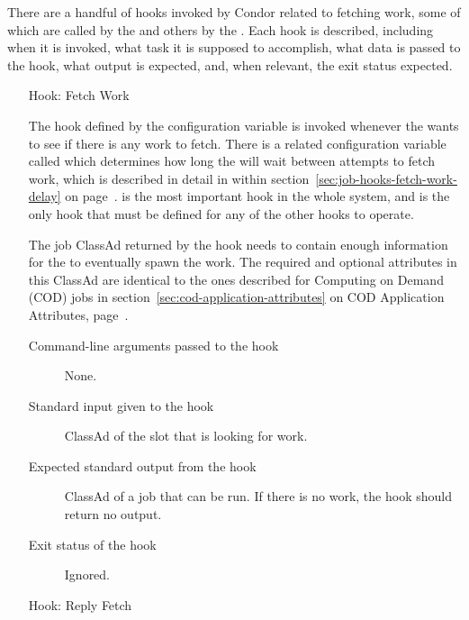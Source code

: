 There are a handful of hooks invoked by Condor related to fetching
work, some of which are called by the  and others by
the .
Each hook is described, including when it is invoked, what
task it is supposed to accomplish, what data is passed to the hook,
what output is expected, and, when relevant, the exit status expected.


\begin{itemize}
\item[Hook: Fetch Work]

The hook defined by the configuration variable
 is invoked whenever the 
wants to see if there is any work to fetch.
There is a related configuration variable called
 which determines how long the 
will wait between attempts to fetch work, which is described in detail
in within section~\ref{sec:job-hooks-fetch-work-delay} on
page~\pageref{sec:job-hooks-fetch-work-delay}.
 is the most important hook in the whole
system, and is the only hook that must be defined for any of the other
 hooks to operate.

The job ClassAd returned by the hook needs to contain enough
information for the  to eventually spawn the work.
The required and optional attributes in this ClassAd are identical to
the ones described for Computing on Demand (COD) jobs in
section~\ref{sec:cod-application-attributes} 
on COD Application Attributes, 
page~\pageref{sec:cod-application-attributes}.

\begin{description}
\item[Command-line arguments passed to the hook]
  None.

\item[Standard input given to the hook]
  ClassAd of the slot that is looking for work.

\item[Expected standard output from the hook]
  ClassAd of a job that can be run.
  If there is no work, the hook should return no output.

\item[Exit status of the hook]
  Ignored.
\end{description}


\item[Hook: Reply Fetch]


\end{itemize}
